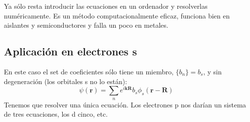 Ya sólo resta introducir las ecuaciones en un ordenador y resolverlas
numéricamente. Es un método computacionalmente eficaz, funciona bien
en aislantes y semiconductores y falla un poco en metales.

\subsection{Aplicación en electrones s}
En este caso el set de coeficientes sólo tiene un miembro,
$\{b_n\} = b_s$, y sin degeneración (los orbitales s no lo están):
\begin{equation}
  \psi(\mathbf{r}) = \sum_{n}e^{i \mathbf{k}\mathbf{R}} b_s \phi_s (\mathbf{r}-\mathbf{R})
\end{equation}
Tenemos que resolver una única ecuación. Los electrones p nos darían
un sistema de tres ecuaciones, los d cinco, etc.

